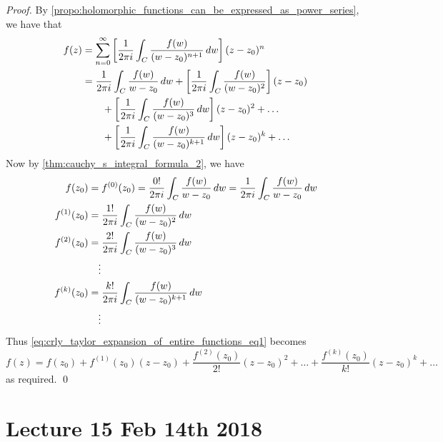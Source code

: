 \documentclass[notoc,notitlepage]{tufte-book}
\begin{document}
\begin{proof}
	By \cref{propo:holomorphic_functions_can_be_expressed_as_power_series}, we have that
	\begin{align}
		f(z) &= \sum_{n=0}^{\infty} \left[ \frac{1}{2 \pi i} \int_{C} \frac{f(w)}{(w - z_0)^{n + 1}} \mathop{}\!d{w} \right] (z - z_0)^n \nonumber \\
			&= \frac{1}{2 \pi i} \int_{C} \frac{f(w)}{w - z_0} \mathop{}\!d{w} + \left[ \frac{1}{2 \pi i} \int_{C} \frac{f(w)}{(w - z_0)^2} \right](z - z_0) \label{eq:crly_taylor_expansion_of_entire_functions_eq1} \\
			&\quad\quad + \left[ \frac{1}{2 \pi i} \int_{C} \frac{f(w)}{(w - z_0)^3} \mathop{}\!d{w} \right] (z - z_0)^2 + \hdots \nonumber \\
			&\quad\quad + \left[ \frac{1}{2 \pi i} \int_{C} \frac{f(w)}{(w - z_0)^{k + 1}} \mathop{}\!d{w} \right] (z - z_0)^k + \hdots \nonumber
	\end{align}
	Now by \cref{thm:cauchy_s_integral_formula_2}, we have
	\begin{align*}
		f(z_0) &= f^{(0)}(z_0) = \frac{0!}{2 \pi i} \int_{C} \frac{f(w)}{w - z_0} \mathop{}\!d{w} = \frac{1}{2 \pi i} \int_{C} \frac{f(w)}{w - z_0} \mathop{}\!d{w} \\
		f^{(1)}(z_0) &= \frac{1!}{2 \pi i} \int_{C} \frac{f(w)}{(w - z_0)^2} \mathop{}\!d{w} \\
		f^{(2)}(z_0) &= \frac{2!}{2 \pi i} \int_{C} \frac{f(w)}{(w - z_0)^3} \mathop{}\!d{w} \\
		&\quad\vdots \\
		f^{(k)}(z_0) &= \frac{k!}{2 \pi i} \int_{C} \frac{f(w)}{(w - z_0)^{k + 1}} \mathop{}\!d{w} \\
		&\quad\vdots
	\end{align*}
	Thus \cref{eq:crly_taylor_expansion_of_entire_functions_eq1} becomes
	\begin{equation*}
		f(z) = f(z_0) + f^{(1)}(z_0)(z - z_0) + \frac{f^{(2)}(z_0)}{2!} (z - z_0)^2 + \hdots + \frac{f^{(k)}(z_0)}{k!} (z - z_0)^k + \hdots
	\end{equation*}
	as required. \qed
\end{proof}



\chapter{Lecture 15 Feb 14th 2018} %
\label{cha:lecture_15_feb_14th_2018}
\end{document}
